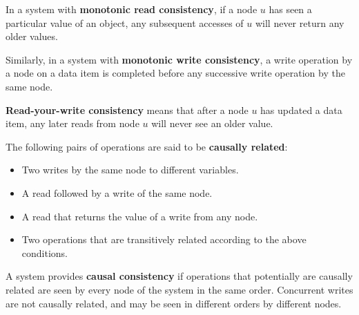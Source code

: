In a system with \textbf{monotonic read consistency}, if a node $u$ has seen a particular value of an object, any subsequent accesses of $u$ will never return any older values. \medskip

Similarly, in a system with \textbf{monotonic write consistency}, a write operation by a node on a data item is completed before any successive write operation by the same node. \medskip

\textbf{Read-your-write consistency} means that after a node $u$ has updated a data item, any later reads from node $u$ will never see an older value. \medskip

The following pairs of operations are said to be \textbf{causally related}:
\begin{itemize}
	\item Two writes by the same node to different variables.
	\item A read followed by a write of the same node.
	\item A read that returns the value of a write from any node.
	\item Two operations that are transitively related according to the above conditions.
\end{itemize}

A system provides \textbf{causal consistency} if operations that potentially are causally related are seen by every node of the system in the same order. Concurrent writes are not causally related, and may be seen in different orders by different nodes.
